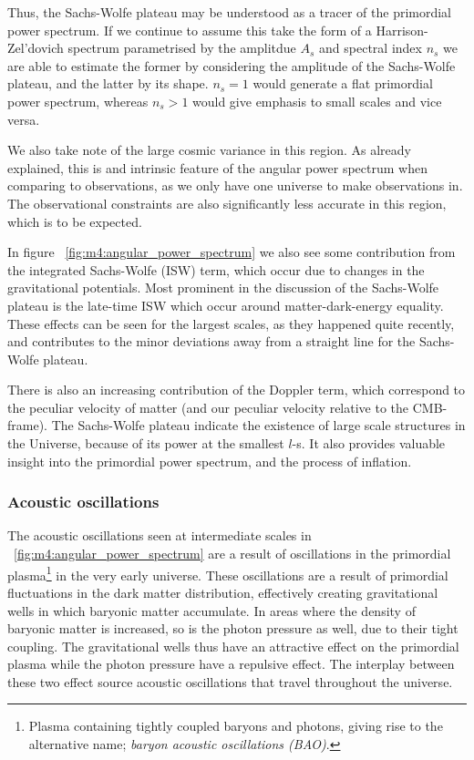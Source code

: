         Thus, the Sachs-Wolfe plateau may be understood as a tracer of the primordial power spectrum. If we continue to assume this take the form of a Harrison-Zel'dovich spectrum parametrised by the amplitdue $A_s$ and spectral index $n_s$ we are able to estimate the former by considering the amplitude of the Sachs-Wolfe plateau, and the latter by its shape. $n_s=1$ would generate a flat primordial power spectrum, whereas $n_s>1$ would give emphasis to small scales and vice versa. 

        We also take note of the large cosmic variance in this region. As already explained, this is and intrinsic feature of the angular power spectrum when comparing to observations, as we only have one universe to make observations in. The observational constraints are also significantly less accurate in this region, which is to be expected. 
        
        In figure ~\cref{fig:m4:angular_power_spectrum} we also see some contribution from the integrated Sachs-Wolfe (ISW) term, which occur due to changes in the gravitational potentials. Most prominent in the discussion of the Sachs-Wolfe plateau is the late-time ISW which occur around matter-dark-energy equality. These effects can be seen for the largest scales, as they happened quite recently, and contributes to the minor deviations away from a straight line for the Sachs-Wolfe plateau.
        
        There is also an increasing contribution of the Doppler term, which correspond to the peculiar velocity of matter (and our peculiar velocity relative to the CMB-frame). The Sachs-Wolfe plateau indicate the existence of large scale structures in the Universe, because of its power at the smallest $l$-s. It also provides valuable insight into the primordial power spectrum, and the process of inflation. 

    \subsubsection{Acoustic oscillations}
        The acoustic oscillations seen at intermediate scales in ~\cref{fig:m4:angular_power_spectrum} are a result of oscillations in the primordial plasma\footnote{Plasma containing tightly coupled baryons and photons, giving rise to the alternative name; \textit{baryon acoustic oscillations (BAO)}.} in the very early universe. These oscillations are a result of primordial fluctuations in the dark matter distribution, effectively creating gravitational wells in which baryonic matter accumulate. In areas where the density of baryonic matter is increased, so is the photon pressure as well, due to their tight coupling. The gravitational wells thus have an attractive effect on the primordial plasma while the photon pressure have a repulsive effect. The interplay between these two effect source acoustic oscillations that travel throughout the universe. 

